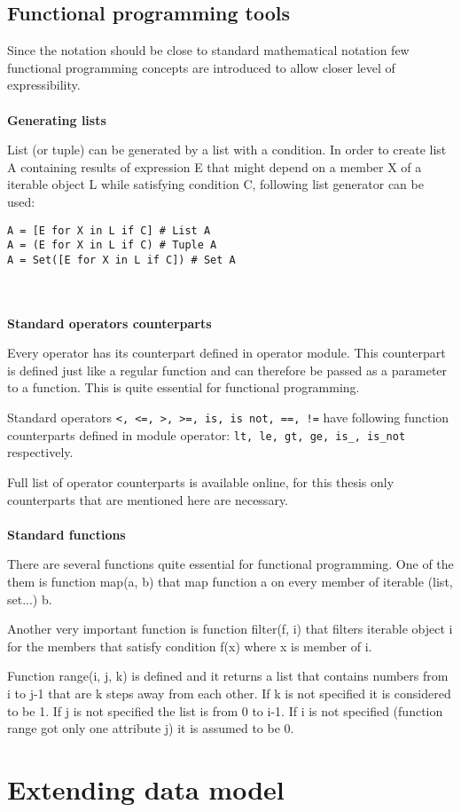 \documentclass[11pt,oneside]{fithesis2}
\newcommand{\markit}[1]{\ \\\\{\noindent\textbf{#1}}}
\newcommand{\T}[1]{\texttt{#1}}
\begin{document}
\section{Functional programming tools}
Since the notation should be close to standard mathematical notation few functional programming concepts are introduced to allow closer level of expressibility.
\markit{Generating lists}

List (or tuple) can be generated by a list with a condition. In order to create list A containing results of expression E that might depend on a member X of a iterable object L while satisfying condition C, following list generator can be used:
\begin{lstlisting}
A = [E for X in L if C] # List A
A = (E for X in L if C) # Tuple A
A = Set([E for X in L if C]) # Set A
\end{lstlisting}
\markit{Standard operators counterparts}

Every operator has its counterpart defined in operator module. This counterpart is defined just like a regular function and can therefore be passed as a parameter to a function. This is quite essential for functional programming.

Standard operators \T{<, <=, >, >=, is, is not, ==, !=} have following function counterparts defined in module operator: \T{lt, le, gt, ge, is\_, is\_not} respectively.

Full list of operator counterparts is available online\cite{operators}, for this thesis only counterparts that are mentioned here are necessary.
\markit{Standard functions}

There are several functions quite essential for functional programming. One of the them is function map(a, b) that map function a on every member of iterable (list, set...) b.

Another very important function is function filter(f, i) that filters iterable object i for the members that satisfy condition f(x) where x is member of i.

Function range(i, j, k) is defined and it returns a list that contains numbers from i to j-1 that are k steps away from each other. If k is not specified it is considered to be 1. If j is not specified the list is from 0 to i-1. If i is not specified (function range got only one attribute j) it is assumed to be 0.


\chapter{Extending data model}
\end{document}
